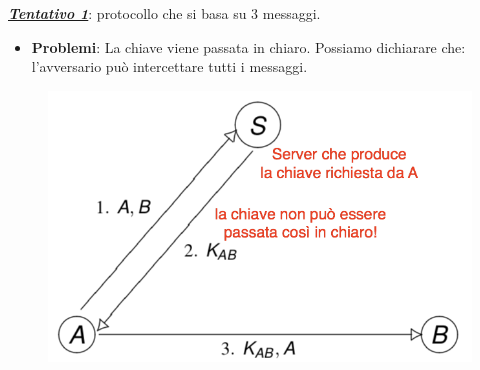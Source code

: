 \documentclass[11pt, a4paper, twoside, italian]{report}
\theoremstyle{plain}
\begin{document}
\noindent
\textbf{\textit{\underline{Tentativo 1}}}: protocollo che si basa su 3 messaggi.
\begin{multicols}{2}
\begin{itemize}
		\item \textbf{Problemi}:
		La chiave viene passata in chiaro. Possiamo dichiarare che: l'avversario può intercettare tutti i messaggi.
\end{itemize}
	\columnbreak
	\begin{figure}[H]
		\centering
		\includegraphics[scale=0.45]{attempt1}
	\end{figure} 
\end{multicols}
\end{document}
